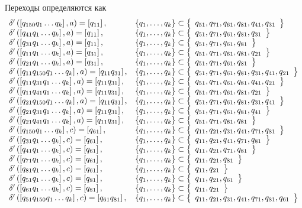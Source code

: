 \newpage
{}
Переходы определяются как
\begin{align*}
	\begin{array}{ll}
		\gendelta{q_{150}}{a}{q_{11}}{\mcqa, q_{41}, q_{31}}                                \\
		\gendelta{q_{41}}{a}{q_{11}}{\mcqa, q_{31}}                                         \\
		\gendelta{q_{31}}{a}{q_{11}}{\mcqa}                                                 \\
		\gendelta{q_{11}}{a}{q_{31}}{\mcqa, q_{21}}                                         \\
		\gendelta{q_{21}}{a}{q_{31}}{\mcqa}                                                 \\
		\gendelta{q_{11}q_{150}}{a}{q_{11}q_{31}}{\mcqa,q_{31}, q_{41},q_{21}}              \\
		\gendelta{q_{11}q_{31}}{a}{q_{11}q_{31}}{\mcqa, q_{41},q_{21}}                      \\
		\gendelta{q_{11}q_{41}}{a}{q_{11}q_{31}}{\mcqa, q_{21}}                             \\
		\gendelta{q_{21}q_{150}}{a}{q_{11}q_{31}}{\mcqa,q_{31}, q_{41}}                     \\
		\gendelta{q_{21}q_{31}}{a}{q_{11}q_{31}}{\mcqa, q_{41}}                             \\
		\gendelta{q_{21}q_{41}}{a}{q_{11}q_{31}}{\mcqa}                                     \\
		\gendelta{q_{150}}{c}{q_{61}}{\mcqc,q_{31},q_{41},q_{71},q_{81}}                    \\
		\gendelta{q_{31}}{c}{q_{61}}{\mcqc,q_{41},q_{71},q_{81}}                            \\
		\gendelta{q_{41}}{c}{q_{61}}{\mcqc,q_{71},q_{81}}                                   \\
		\gendelta{q_{71}}{c}{q_{61}}{\mcqc,q_{81}}                                          \\
		\gendelta{q_{81}}{c}{q_{61}}{\mcqc}                                                 \\
		\gendelta{q_{51}}{c}{q_{81}}{\mcqc, q_{61}}                                         \\
		\gendelta{q_{61}}{c}{q_{81}}{\mcqc}                                                 \\
		\gendelta{q_{51}q_{150}}{c}{q_{61}q_{81}}{\mcqc,q_{31},q_{41},q_{71},q_{81},q_{61}} \\

\end{array}
\end{align*}
